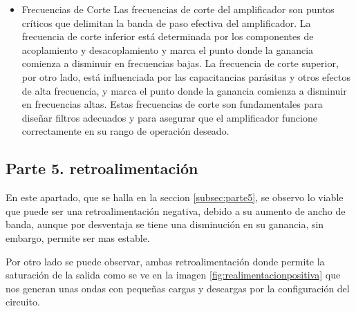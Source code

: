 \begin{itemize}
      \item Frecuencias de Corte
            Las frecuencias de corte del amplificador son puntos críticos que delimitan la banda de paso efectiva del amplificador. La frecuencia de corte inferior está determinada por los componentes de acoplamiento y desacoplamiento y marca el punto donde la ganancia comienza a disminuir en frecuencias bajas. La frecuencia de corte superior, por otro lado, está influenciada por las capacitancias parásitas y otros efectos de alta frecuencia, y marca el punto donde la ganancia comienza a disminuir en frecuencias altas. Estas frecuencias de corte son fundamentales para diseñar filtros adecuados y para asegurar que el amplificador funcione correctamente en su rango de operación deseado.

\end{itemize}









\subsection{Parte 5. retroalimentación}

En este apartado, que se halla en la seccion \ref{subsec:parte5}, se observo lo viable que puede ser una retroalimentación negativa, debido a su aumento de ancho de banda, aunque por desventaja se tiene una disminución en su ganancia, sin embargo, permite ser mas estable.

Por otro lado se puede observar, ambas retroalimentación donde permite la saturación de la salida como se ve en la imagen \ref{fig:realimentacionpositiva} que nos generan unas ondas con pequeñas cargas y descargas por la configuración del circuito.


\newpage